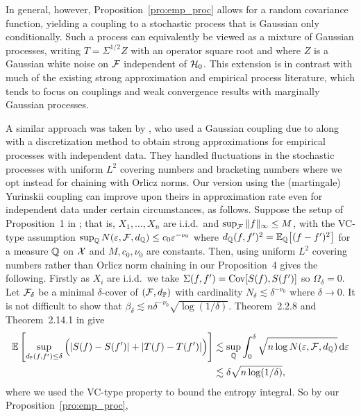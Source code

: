 In general, however, Proposition~\ref{pro:emp_proc} allows for a random
covariance function, yielding a coupling to a stochastic process that is
Gaussian only conditionally. Such a process can equivalently be viewed as a
mixture of Gaussian processes, writing $T=\Sigma^{1/2} Z$ with an operator
square root and where $Z$ is a Gaussian white noise on $\mathcal{F}$ independent of
$\mathcal{H}_0$. This extension is in contrast with much of the existing strong
approximation and empirical process literature, which tends to focus on
couplings and weak convergence results with marginally Gaussian processes.

A similar approach was taken by \citet{berthet2006revisiting}, who used a
Gaussian coupling due to \citet{zaitsev1987estimates,zaitsev1987gaussian} along
with a discretization method to obtain strong approximations for empirical
processes with independent data. They handled fluctuations in the stochastic
processes with uniform $L^2$ covering numbers and bracketing numbers where we
opt instead for chaining with Orlicz norms. Our version using the (martingale)
Yurinskii coupling can improve upon theirs in approximation rate even for
independent data under certain circumstances, as follows. Suppose the setup of
Proposition~1 in \citet{berthet2006revisiting}; that is, $X_1, \ldots, X_n$ are
i.i.d.\ and $\sup_{\mathcal{F}} \|f\|_\infty \leq M$, with the VC-type assumption
$\sup_{\mathbb{Q}} N(\varepsilon, \mathcal{F}, d_{\mathbb{Q}}) \leq c_0 \varepsilon^{-\nu_0}$ where
$d_{\mathbb{Q}}(f,f')^2 = \mathbb{E}_{\mathbb{Q}}\big[(f-f')^2\big]$ for a measure $\mathbb{Q}$ on $\mathcal{X}$ and
$M, c_0, \nu_0$ are constants. Then, using uniform $L^2$ covering numbers
rather than Orlicz norm chaining in our Proposition~4 gives the following.
Firstly as $X_i$ are i.i.d.\ we take $\Sigma(f, f') = \operatorname{Cov}[S(f), S(f')]$ so
$\Omega_\delta = 0$. Let $\mathcal{F}_\delta$ be a minimal $\delta$-cover of
$(\mathcal{F}, d_{\mathbb{P}})$ with cardinality $N_\delta \lesssim \delta^{-\nu_0}$ where
$\delta \to 0$. It is not difficult to show that
$\beta_\delta \lesssim n \delta^{-\nu_0} \sqrt{\log(1/\delta)}$.
Theorem~2.2.8 and Theorem~2.14.1 in \citet{van1996weak} give
%
\begin{align*}
  \mathbb{E}\left[
    \sup_{d_{\mathbb{P}}(f,f') \leq \delta}
    \Big(
      |S(f) - S(f')|
      + |T(f) - T(f')|
    \Big)
  \right]
  &\lesssim
  \sup_{\mathbb{Q}}
  \int_0^\delta
  \sqrt{n \log N(\varepsilon, \mathcal{F}, d_{\mathbb{Q}})}
  \,\mathrm{d}\varepsilon \\
  &\lesssim
  \delta \sqrt{n\log(1/\delta)},
\end{align*}
%
where we used the VC-type property to bound the entropy integral.
So by our Proposition~\ref{pro:emp_proc},
